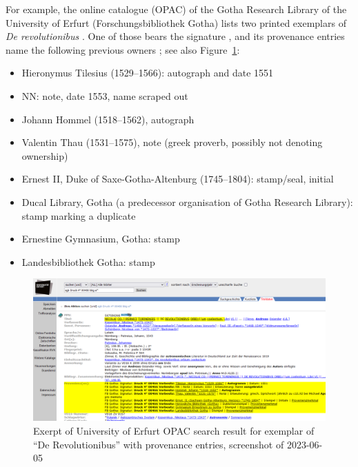 For example, the online catalogue (OPAC) of the Gotha Research Library of the University of Erfurt (Forschungsbibliothek Gotha) lists two printed exemplars
of \emph{De revolutionibus} \autocite{OPACDeRev}.
One of those bears the signature , and its provenance entries name the following previous owners \autocite{OPACDeRevPPN}; see also Figure~\ref{fig:OPAC_derev_provenance}:
%
\begin{itemize}
  \item
    Hieronymus Tilesius (1529–1566): autograph and date 1551
  \item
    NN: note, date 1553, name scraped out
  \item
    Johann Hommel (1518–1562), autograph
  \item
    Valentin Thau (1531–1575), note (greek proverb, possibly not denoting ownership)
  \item
    Ernest II, Duke of Saxe-Gotha-Altenburg (1745–1804): stamp/seal, initial
  \item
    Ducal Library, Gotha (a predecessor organisation of Gotha Research Library): stamp marking a duplicate
  \item
    Ernestine Gymnasium, Gotha: stamp
  \item
    Landesbibliothek Gotha: stamp
\end{itemize}

\begin{figure}[ht]
  \centering
  \includegraphics[width=\linewidth,trim=88 1 26 123,clip]{img/opac_derev_prov.png}
  \caption{Exerpt of University of Erfurt OPAC search result for exemplar  of \enquote{De Revolutionibus} with provenance entries, screenshot of 2023-06-05}
  \label{fig:OPAC_derev_provenance}
\end{figure}

